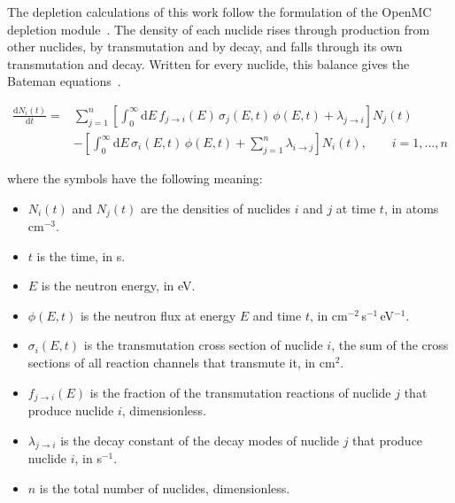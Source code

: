 The depletion calculations of this work follow the formulation of the
OpenMC depletion module~\cite{romano_2021_depletion}. The density of
each nuclide rises through production from other nuclides, by
transmutation and by decay, and falls through its own transmutation and
decay. Written for every nuclide, this balance gives the Bateman
equations~\cite{romano_2021_depletion}.

\begin{equation}
\begin{split}
\frac{\mathrm{d}N_i(t)}{\mathrm{d}t} = {} &
\sum_{j=1}^{n}\left[\int_0^\infty \mathrm{d}E\,
f_{j\rightarrow i}(E)\,\sigma_j(E,t)\,\phi(E,t)
+ \lambda_{j\rightarrow i}\right] N_j(t) \\
& - \left[\int_0^\infty \mathrm{d}E\,\sigma_i(E,t)\,\phi(E,t)
+ \sum_{j=1}^{n}\lambda_{i\rightarrow j}\right] N_i(t),
\qquad i = 1,\dots,n
\end{split}
\label{eq:bateman}
\end{equation}

\noindent where the symbols have the following meaning:

\begin{itemize}
  \item $N_i(t)$ and $N_j(t)$ are the densities of nuclides $i$ and $j$
        at time $t$, in atoms\,cm$^{-3}$.

  \item $t$ is the time, in s.

  \item $E$ is the neutron energy, in eV.

  \item $\phi(E,t)$ is the neutron flux at energy $E$ and time $t$, in
        cm$^{-2}$\,s$^{-1}$\,eV$^{-1}$.

  \item $\sigma_i(E,t)$ is the transmutation cross section of nuclide
        $i$, the sum of the cross sections of all reaction channels that
        transmute it, in cm$^{2}$.

  \item $f_{j\rightarrow i}(E)$ is the fraction of the transmutation
        reactions of nuclide $j$ that produce nuclide $i$,
        dimensionless.

  \item $\lambda_{j\rightarrow i}$ is the decay constant of the decay
        modes of nuclide $j$ that produce nuclide $i$, in s$^{-1}$.

  \item $n$ is the total number of nuclides, dimensionless.
\end{itemize}


